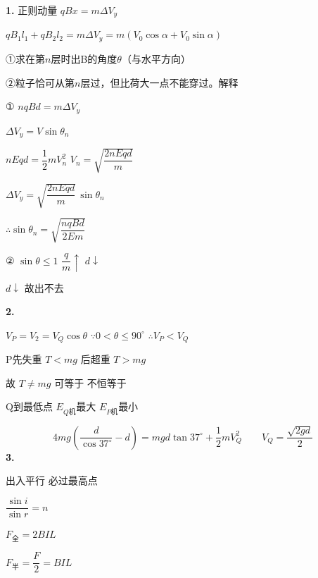 \textbf{1.} 正则动量 \quad $qBx=m\Delta V_y$ \quad {} \quad {}

$qB_1l_1+qB_2l_2=m\Delta V_y=m(V_0\cos\alpha+V_0\sin\alpha)$

\begin{problem}
①求在第$n$层时出B的角度$\theta$（与水平方向）

②粒子恰可从第$n$层过，但比荷大一点不能穿过。解释
\begin{solution}
① $nqBd=m\Delta V_y$

$\Delta V_y=V\sin\theta_n$

$nEqd=\dfrac12 mV_n^{2}$ \qquad $V_n=\sqrt{\dfrac{2nEqd}{m}}$

$\Delta V_y=\sqrt{\dfrac{2nEqd}{m}}\,\sin\theta_n$

$\therefore\sin\theta_n=\sqrt{\dfrac{nqBd}{2Em}}$ %

② $\sin\theta\le1$ \qquad $\dfrac{q}{m}\uparrow$ \qquad $d\downarrow$

$d\downarrow$ 故出不去
\end{solution}
\end{problem}
\textbf{2.}

$V_P=V_2=V_Q\cos\theta$ \qquad $\because 0<\theta\le90^\circ$ \quad $\therefore V_P<V_Q$

P先失重 $T<mg$ 后超重 $T>mg$ %

故 $T\ne mg$ \quad 可等于 不恒等于

Q到最低点 $E_{Q\text{机}}$最大 $E_{P\text{机}}$最小

\[ 4mg\left(\frac{d}{\cos37^\circ}-d\right)=mgd\tan37^\circ+\frac12 mV_Q^{2}\qquad V_Q=\frac{\sqrt{2gd}}{2} \]
\textbf{3.}


出入平行 必过最高点

$\dfrac{\sin i}{\sin r}=n$

$F_{\text{全}}=2BIL$

\underline{$F_{\text{半}}=\dfrac{F}{2}=BIL$}  \quad {} %
